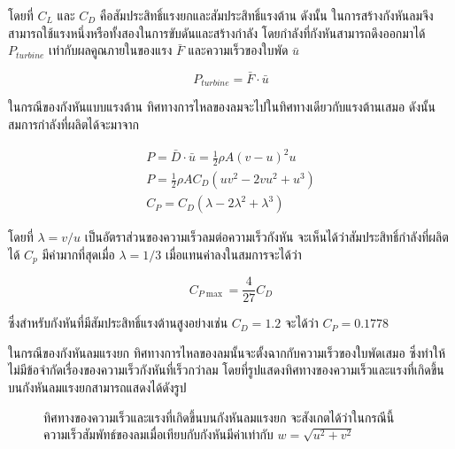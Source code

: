 \message{ !name(solar.tex)}\documentclass[
a4paper,
svgnames,
openany,
justified,
]{tufte-book}
\begin{document}
โดยที่ $C_L$ และ $C_D$ คือสัมประสิทธิ์แรงยกและสัมประสิทธิ์แรงต้าน ดังนั้น ในการสร้างกังหันลมจึงสามารถใช้แรงหนึ่งหรือทั้งสองในการขับดันและสร้างกำลัง โดยกำลังที่กังหันสามารถดึงออกมาได้ $P_{turbine}$ เท่ากับผลคูณภายในของแรง $\bar{F}$ และความเร็วของใบพัด $\bar{u}$ 

\begin{equation}
  \label{eq:basic turbine power}
  P_{turbine} = \bar{F} \cdot \bar{u}
\end{equation}

ในกรณีของกังหันแบบแรงต้าน ทิศทางการไหลของลมจะไปในทิศทางเดียวกับแรงต้านเสมอ ดังนั้นสมการกำลังที่ผลิตได้จะมาจาก

\begin{gather}
  P = \bar{D} \cdot \bar{u} = \frac{1}{2} \rho A (v - u)^2 u \nonumber \\
  P = \frac{1}{2} \rho A C_D (uv^2 - 2vu^2 + u^3) \nonumber \\
  C_P = C_D \left( \lambda - 2\lambda^2 + \lambda^3 \right)
\end{gather}

โดยที่ $\lambda = v / u$ เป็นอัตราส่วนของความเร็วลมต่อความเร็วกังหัน จะเห็นได้ว่าสัมประสิทธิ์กำลังที่ผลิตได้ $C_p$ มีค่ามากที่สุดเมื่อ $\lambda = 1/3$ เมื่อแทนค่าลงในสมการจะได้ว่า

\begin{equation}
  C_{P \max} = \dfrac{4}{27}C_D
  \label{eq:max power drag based}
\end{equation}

ซึ่งสำหรับกังหันที่มีสัมประสิทธิ์แรงต้านสูงอย่างเช่น $C_D = 1.2$ จะได้ว่า $C_P = 0.1778$

ในกรณีของกังหันลมแรงยก ทิศทางการไหลของลมนั้นจะตั้งฉากกับความเร็วของใบพัดเสมอ ซึ่งทำให้ไม่มีข้อจำกัดเรื่องของความเร็วกังหันที่เร็วกว่าลม โดยที่รูปแสดงทิศทางของความเร็วและแรงที่เกิดขึ้นบนกังหันลมแรงยกสามารถแสดงได้ดังรูป

\begin{figure}[h]
  \centering
  \caption{ทิศทางของความเร็วและแรงที่เกิดขึ้นบนกังหันลมแรงยก จะสังเกตได้ว่าในกรณีนี้ ความเร็วสัมพัทธ์ของลมเมื่อเทียบกับกังหันมีค่าเท่ากับ $w = \sqrt{ u^2 + v^2}$}
  \label{fig:lift-based turbine}
\end{figure}
\end{document}
